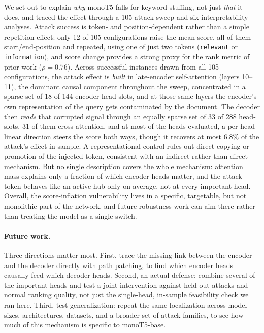 \documentclass[11pt]{article}
\begin{document}
We set out to explain \emph{why} monoT5 falls for keyword stuffing, not just
\emph{that} it does, and traced the effect through a 105-attack sweep and six
interpretability analyses. Attack success is token- and position-dependent
rather than a simple repetition effect: only 12 of 105 configurations raise
the mean score, all of them start/end-position and repeated, using one of
just two tokens (\texttt{relevant} or \texttt{information}), and score
change provides a strong proxy for the rank metric of
prior work ($\rho=0.76$). Across successful instances drawn from all 105
configurations, the attack effect is \emph{built} in late-encoder
self-attention (layers 10--11), the dominant causal component throughout
the sweep, concentrated in a sparse set of 18 of 144 encoder head-slots,
and at those same layers the encoder's own representation of the query
gets contaminated by the document. The decoder then \emph{reads} that
corrupted signal through an equally sparse set of 33 of 288 head-slots,
31 of them cross-attention, and at most of the heads evaluated, a
per-head linear direction steers the score both ways, though it recovers
at most $6.8\%$ of the attack's effect in-sample. A representational
control rules out direct copying or promotion of the injected token,
consistent with an indirect rather than direct mechanism. But no single
description covers the whole mechanism: attention mass explains only a
fraction of which encoder heads matter, and the attack token behaves like
an active hub only on average, not at every important head.
Overall, the score-inflation vulnerability lives in a specific,
targetable, but not monolithic part of the network, and future
robustness work can aim there rather than treating the model as a single
switch.

\paragraph{Future work.} Three directions matter most. First, trace the
missing link between the encoder and the decoder directly with path
patching, to find which encoder heads causally feed which decoder heads.
Second, an actual defense: combine several of the important heads and
test a joint intervention against held-out attacks and normal ranking
quality, not just the single-head, in-sample feasibility check we ran
here. Third, test generalization: repeat the same localization across
model sizes, architectures, datasets, and a broader set of attack
families, to see how much of this mechanism is specific to
monoT5-base.
 
\end{document}
